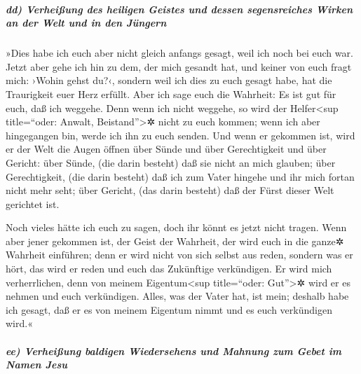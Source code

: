 \hypertarget{dd-verheiuxdfung-des-heiligen-geistes-und-dessen-segensreiches-wirken-an-der-welt-und-in-den-juxfcngern}{%
\subparagraph{dd) Verheißung des heiligen Geistes und dessen
segensreiches Wirken an der Welt und in den
Jüngern}\label{dd-verheiuxdfung-des-heiligen-geistes-und-dessen-segensreiches-wirken-an-der-welt-und-in-den-juxfcngern}}

»Dies habe ich euch aber nicht gleich anfangs gesagt, weil ich noch bei
euch war.  Jetzt aber gehe ich hin zu dem, der mich
gesandt hat, und keiner von euch fragt mich: ›Wohin gehst du?‹,
 sondern weil ich dies zu euch gesagt habe, hat die
Traurigkeit euer Herz erfüllt.  Aber ich sage euch die
Wahrheit: Es ist gut für euch, daß ich weggehe. Denn wenn ich nicht
weggehe, so wird der Helfer\textless sup title=``oder: Anwalt,
Beistand''\textgreater✲ nicht zu euch kommen; wenn ich aber hingegangen
bin, werde ich ihn zu euch senden.  Und wenn er gekommen
ist, wird er der Welt die Augen öffnen über Sünde und über Gerechtigkeit
und über Gericht:  über Sünde, (die darin besteht) daß sie
nicht an mich glauben;  über Gerechtigkeit, (die darin
besteht) daß ich zum Vater hingehe und ihr mich fortan nicht mehr seht;
 über Gericht, (das darin besteht) daß der Fürst dieser
Welt gerichtet ist.

 Noch vieles hätte ich euch zu sagen, doch ihr könnt es
jetzt nicht tragen.  Wenn aber jener gekommen ist, der
Geist der Wahrheit, der wird euch in die ganze✲ Wahrheit einführen; denn
er wird nicht von sich selbst aus reden, sondern was er hört, das wird
er reden und euch das Zukünftige verkündigen.  Er wird
mich verherrlichen, denn von meinem Eigentum\textless sup title=``oder:
Gut''\textgreater✲ wird er es nehmen und euch verkündigen. Alles, was
der Vater hat, ist mein;  deshalb habe ich gesagt, daß er
es von meinem Eigentum nimmt und es euch verkündigen wird.«

\hypertarget{ee-verheiuxdfung-baldigen-wiedersehens-und-mahnung-zum-gebet-im-namen-jesu}{%
\subparagraph{ee) Verheißung baldigen Wiedersehens und Mahnung zum Gebet
im Namen
Jesu}\label{ee-verheiuxdfung-baldigen-wiedersehens-und-mahnung-zum-gebet-im-namen-jesu}}

